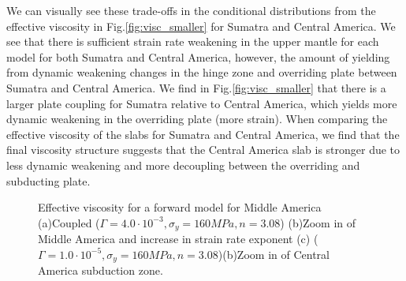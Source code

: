 \documentclass[12pt]{article}
\begin{document}
We can visually see these trade-offs in the conditional distributions from the effective viscosity in Fig.\ref{fig:visc_smaller} for Sumatra and Central America. We see that there is sufficient strain rate weakening in the upper mantle for each model for both Sumatra and Central America, however, the amount of yielding from dynamic weakening changes in the hinge zone and overriding plate between Sumatra and Central America. We find in Fig.\ref{fig:visc_smaller} that there is a larger plate coupling for Sumatra relative to Central America, which  yields more dynamic weakening in the overriding plate (more strain). When comparing the effective viscosity of the slabs for Sumatra and Central America, we find that the final viscosity structure suggests that the Central America slab is stronger due to less dynamic weakening and more decoupling between the overriding and subducting plate. 



\begin{figure}[H]
\centering

\hspace{-1.0cm}

\hspace{0.2cm}
\caption{Effective viscosity for a forward model for Middle America (a)Coupled ($\Gamma = 4.0 \cdot 10^{-3}, \sigma_y = 160 MPa, n = 3.08$) (b)Zoom in of Middle America and increase in strain rate exponent (c) ($\Gamma = 1.0 \cdot 10^{-5}, \sigma_y = 160 MPa, n = 3.08$)(b)Zoom in of Central America subduction zone.}
\label{fig:middle_physics}
\end{figure}
\end{document}
